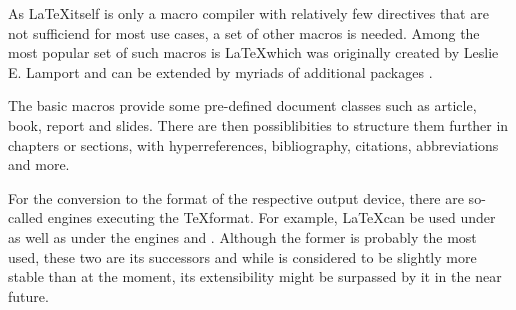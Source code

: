 As \LaTeX itself is only a macro compiler with relatively few directives that are not sufficiend for most use cases, a set of other macros is needed. Among the most popular set of such macros is \LaTeX which was originally created by Leslie E. Lamport and can be extended by myriads of additional packages \cite{website:dante}.

\pagebreak

The basic macros provide some pre-defined document classes such as article, book, report and slides. There are then possiblibities to structure them further in chapters or sections, with hyperreferences, bibliography, citations, abbreviations and more.

For the conversion to the format of the respective output device, there are so-called engines executing the \TeX format. For example, \LaTeX can be used under  as well as under the engines  and . Although the former is probably the most used, these two are its successors and while  is considered to be slightly more stable than  at the moment, its extensibility might be surpassed by it in the near future.
